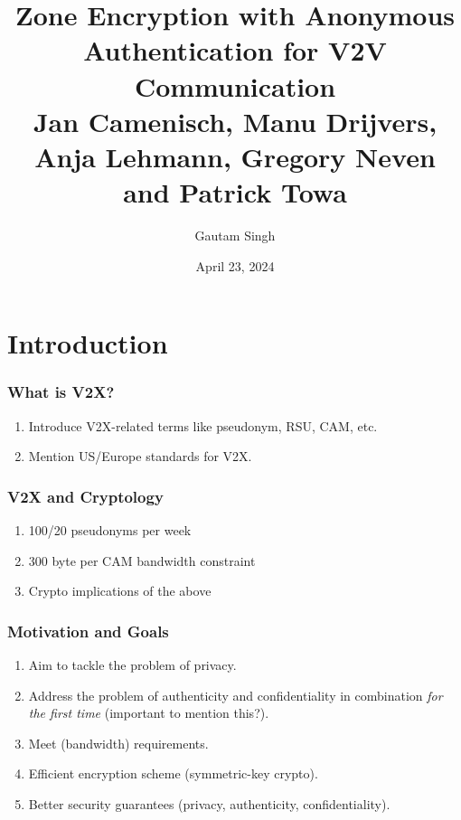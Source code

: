 \documentclass{beamer}
\title[ZE-V2V]{Zone Encryption with Anonymous Authentication for V2V Communication \\
\small Jan Camenisch, Manu Drijvers, Anja Lehmann, Gregory Neven and Patrick Towa}
\date{April 23, 2024}
\author{Gautam Singh}
\institute[]{Indian Institute of Technology Hyderabad}
\begin{document}
    \maketitle
    \tableofcontents
    \section{Introduction}
    
    \begin{frame}
        \frametitle{What is V2X?}
        \begin{enumerate}
            \item Introduce V2X-related terms like pseudonym, RSU, CAM, etc.
            \item Mention US/Europe standards for V2X.
        \end{enumerate}
    \end{frame}

    \begin{frame}
        \frametitle{V2X and Cryptology}
        \begin{enumerate}
            \item 100/20 pseudonyms per week
            \item 300 byte per CAM bandwidth constraint
            \item Crypto implications of the above
        \end{enumerate}
    \end{frame}

    \begin{frame}
        \frametitle{Motivation and Goals}
        \begin{enumerate}
            \item Aim to tackle the problem of privacy.
            \item Address the problem of authenticity and confidentiality in
            combination \emph{for the first time} (important to mention this?).
            \item Meet (bandwidth) requirements.
            \item Efficient encryption scheme (symmetric-key crypto).
            \item Better security guarantees (privacy, authenticity,
            confidentiality).
        \end{enumerate}
    \end{frame}
\end{document}
